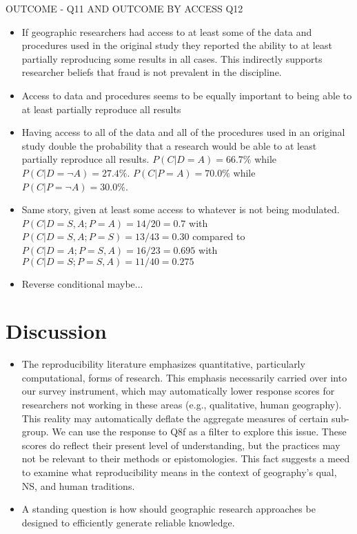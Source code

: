 \documentclass[]{interact}
\theoremstyle{plain}%
\theoremstyle{definition}
\theoremstyle{remark}
\begin{document}
OUTCOME - Q11 AND OUTCOME BY ACCESS Q12
\begin{itemize}
    \item If geographic researchers had access to at least some of the data and procedures used in the original study they reported the ability to at least partially reproducing some results in all cases. This indirectly supports researcher beliefs that fraud is not prevalent in the discipline.
    \item Access to data and procedures seems to be equally important to being able to at least partially reproduce all results
    \item Having access to all of the data and all of the procedures used in an original study double the probability that a research would be able to at least partially reproduce all results. $P(C|D=A)=66.7\%$ while $P(C|D=\neg A)=27.4\%$. $P(C|P=A)=70.0\%$ while $P(C|P=\neg A)=30.0\%$.
    \item Same story, given at least some access to whatever is not being modulated. $P(C|D=S,A;P=A)=14/20=0.7$ with $P(C|D=S,A;P=S)=13/43=0.30$ compared to $P(C|D=A;P=S,A)=16/23=0.695$ with $P(C|D=S;P=S,A)=11/40=0.275$
    \item Reverse conditional maybe...
\end{itemize}

\section*{Discussion}

\begin{itemize}
    \item The reproducibility literature emphasizes quantitative, particularly computational, forms of research. This emphasis necessarily carried over into our survey instrument, which may automatically lower response scores for researchers not working in these areas (e.g., qualitative, human geography). This reality may automatically deflate the aggregate measures of certain sub-group. We can use the response to Q8f as a filter to explore this issue. These scores do reflect their present level of understanding, but the practices may not be relevant to their methods or epistomologies. This fact suggests a meed to examine what reproducibility means in the context of geography's qual, NS, and human traditions.
    \item A standing question is how should geographic research approaches be designed to efficiently generate reliable knowledge.
\end{itemize}
\end{document}
